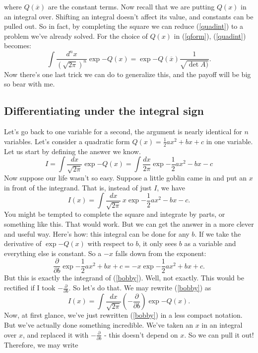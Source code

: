 \documentclass[main.tex]{subfiles}
\begin{document}
where $Q(\overline{x})$ are the constant terms. Now recall that we are putting $Q(x)$ in an integral over. Shifting an integral doesn't affect its value, and constants can be pulled out. So in fact, by completing the square we can reduce (\ref{quadint}) to a problem we've already solved. For the choice of $Q(x)$ in (\ref{qform}), (\ref{quadint}) becomes:
\begin{equation} \label{cts}
\int \frac{d^n x}{(\sqrt{2\pi})^n} \exp{-Q(x)} = \exp{-Q(\overline{x})} \frac{1}{\sqrt{\det A)}}.
\end{equation}
Now there's one last trick we can do to generalize this, and the payoff will be big so bear with me. 

\newpage
\subsection{Differentiating under the integral sign}
Let's go back to one variable for a second, the argument is nearly identical for $n$ variables. Let's consider a quadratic form $Q(x) = \frac{1}{2} ax^2 + bx + c$ in one variable. Let us start by defining the answer we know.
\[
I = \int \frac{dx}{\sqrt{2\pi}} \exp{-Q(x)} = \int \frac{dx}{2\pi} \exp{-\frac{1}{2}ax^2 - bx - c}
\]
Now suppose our life wasn't so easy. Suppose a little goblin came in and put an $x$ in front of the integrand. That is, instead of just $I$, we have
\begin{equation} \label{bobby}
I (x) = \int \frac{dx}{\sqrt{2\pi}} \, x \exp{-\frac{1}{2} a x^2 - bx - c}. 
\end{equation}
You might be tempted to complete the square and integrate by parts, or something like this. That would work. But we can get the answer in a more clever and useful way. Here's how: this integral can be done for any $b$. If we take the derivative of $\exp{-Q(x)}$ with respect to $b$, it only sees $b$ as a variable and everything else is constant. So a $-x$ falls down from the exponent:
\[
\frac{\partial}{\partial b} \exp{-\frac{1}{2}ax^2 + bx + c} = - x \exp{-\frac{1}{2} ax^2 + bx + c}.
\]
But this is exactly the integrand of (\ref{bobby}). Well, not exactly. This would be rectified if I took $-\frac{\partial}{\partial b}$. So let's do that. We may rewrite (\ref{bobby}) as 
\begin{equation}
I (x) = \int \frac{dx}{\sqrt{2\pi}} \left(-\frac{\partial}{\partial b}\right) \exp{-Q(x)}.
\end{equation}
Now, at first glance, we've just rewritten (\ref{bobby}) in a less compact notation. But we've actually done something incredible. We've taken an $x$ in an integral over $x$, and replaced it with $-\frac{\partial}{\partial b}$ - this doesn't depend on $x$. So we can pull it out! Therefore, we may write
\end{document}

